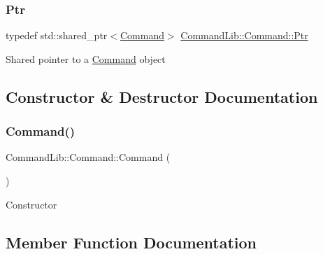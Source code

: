 \mbox{\label{class_command_lib_1_1_command_a3b3e4f00144373299df5c6bb1acc319d}} 
\subsubsection{\texorpdfstring{Ptr}{Ptr}}
{\footnotesize\ttfamily typedef std\+::shared\+\_\+ptr$<$\mbox{\hyperlink{class_command_lib_1_1_command}{Command}}$>$ \mbox{\hyperlink{class_command_lib_1_1_command_a3b3e4f00144373299df5c6bb1acc319d}{Command\+Lib\+::\+Command\+::\+Ptr}}}



Shared pointer to a \mbox{\hyperlink{class_command_lib_1_1_command}{Command}} object



\subsection{Constructor \& Destructor Documentation}
\mbox{\label{class_command_lib_1_1_command_a31713edf2ee9c217f9090e5337dd1f44}} 
\subsubsection{\texorpdfstring{Command()}{Command()}}
{\footnotesize\ttfamily Command\+Lib\+::\+Command\+::\+Command (\begin{DoxyParamCaption}{ }\end{DoxyParamCaption})\hspace{0.3cm}{\ttfamily [protected]}}



Constructor 



\subsection{Member Function Documentation}
\mbox{\label{class_command_lib_1_1_command_a247cbc7325e3b9d9d7044d449b989aa6}} 
